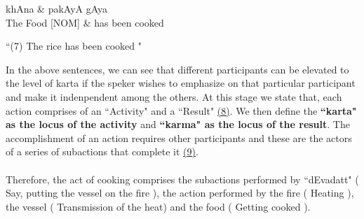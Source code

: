 \documentclass[twoside]{article}
\begin{document}
\hypertarget{fig7}{}
\begin{center}
\begin{dependency}[arc edge, arc angle=80, text only label, label style={above}]
   \begin{deptext}[column sep=1em]
      
      khAna \& pakAyA gAya \\
      The Food [NOM] \& has been cooked \\
   \end{deptext}
   
\end{dependency} 

 ``(7) The rice has been cooked " 
 

\end{center}
In the above sentences, we can see that different participants can be elevated to the level of karta if the speker wishes to emphasize on that particular participant and make it indenpendent among the others. 
At this stage we state that, each action comprises of an ``Activity" and a ``Result" \hyperlink{fig8}{(8)}. We then define the \textbf{``karta" as the locus of the activity} and \textbf{``karma" as the locus of the result}. 
The accomplishment of an action requires other participants and these are the actors of a series of subactions that complete it \hyperlink{fig9}{(9)}. 
\\ \\  Therefore, the act of cooking comprises the subactions performed by ``dEvadatt" ( Say, putting the vessel on the fire ), the action performed by the fire ( Heating ), the vessel ( Transmission of the heat) and the food ( Getting cooked ). 
\end{document}
